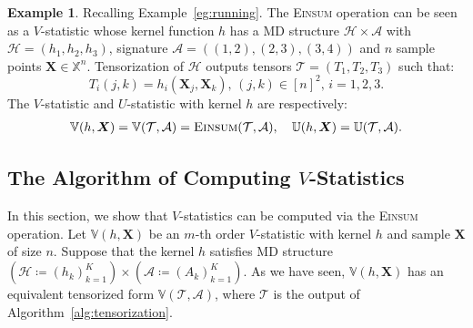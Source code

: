 \documentclass[12pt]{article}
\newcommand{\pdfv}{\texorpdfstring{$V$}{V}}
\theoremstyle{plain}
\theoremstyle{definition}
\newtheorem{subexample}{Example}
\def\Einsum{\textsc{Einsum}}
\newcommand{\ustat}{\mathbb{U}}
\newcommand{\vstat}{\mathbb{V}}
\newcommand{\samplespace}{\bbX}
\newcommand{\bbR}{{\mathbb{R}}}
\def\bbX{\mathbb{X}}
\def\calA{\mathcal{A}}
\def\calT{\mathcal{T}}
\def\calH{\mathcal{H}}
\begin{document}
\begin{bibunit}[agsm]
\setcounter{example}{1}
\begin{subexample}
\label{eg:running-a}
Recalling Example~\ref{eg:running}. The \Einsum{} operation can be seen as a $V$-statistic whose kernel function $h$ has a MD structure $\calH \times \calA$ with $\calH = (h_1, h_2, h_3)$, signature $\calA = ( (1,2),(2,3),(3,4))$ and $n$ sample points $\bm{X} \in \samplespace^{n}$. Tensorization of $\calH$ outputs tensors $\calT = ( T_1, T_2, T_3)$ such that:
\begin{equation*}
T_i (j,k) = h_i (\bm{X}_{j}, \bm{X}_{k}),  \, (j,k) \in [n]^2,  \, i = 1,2,3.
\end{equation*}
The $V$-statistic and $U$-statistic with kernel $h$ are respectively:
\begin{align*}
\vstat(h, \bm{X}) = \vstat (\calT, \calA) = \Einsum{}(\calT, \calA), \quad \ustat(h, \bm{X}) = \ustat(\calT, \calA).
\end{align*}
\end{subexample}

\subsection{The Algorithm of Computing \pdfv{}-Statistics}
\label{sec:alg_v}

In this section, we show that $V$-statistics can be computed via the \Einsum{} operation. Let $\vstat(h, \bm{X})$ be an $m$-th order $V$-statistic with kernel $h$ and sample $\bm{X}$ of size $n$. Suppose that the kernel $h$ satisfies MD structure $(\calH \coloneqq (h_k)_{k=1}^K) \times (\calA \coloneqq (A_k)_{k=1}^K)$. As we have seen, $\vstat(h, \bm{X})$ has an equivalent tensorized form $\vstat(\calT, \calA)$, where $\calT$ is the output of Algorithm~\ref{alg:tensorization}. 


\end{bibunit}
\end{document}

